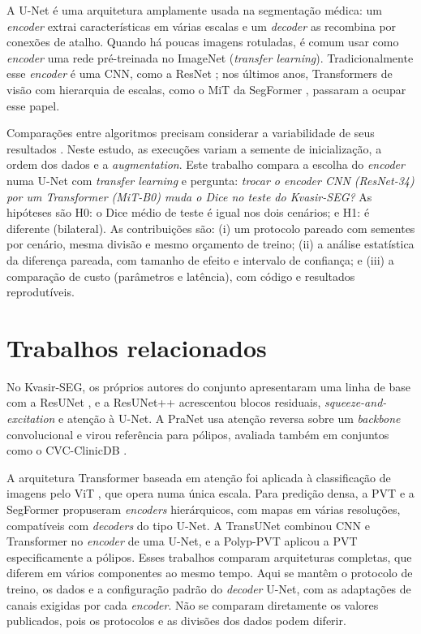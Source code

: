 \documentclass[conference]{IEEEtran}
\begin{document}
A U-Net \cite{ronneberger2015unet} é uma arquitetura amplamente usada na segmentação médica: um
\textit{encoder} extrai características em várias escalas e um \textit{decoder} as recombina por
conexões de atalho. Quando há poucas imagens rotuladas, é comum usar como \textit{encoder} uma
rede pré-treinada no ImageNet \cite{deng2009imagenet} (\textit{transfer learning}).
Tradicionalmente esse \textit{encoder} é uma CNN, como a ResNet \cite{he2016resnet}; nos últimos
anos, Transformers de visão \cite{dosovitskiy2021vit} com hierarquia de escalas, como o MiT da
SegFormer \cite{xie2021segformer}, passaram a ocupar esse papel.

Comparações entre algoritmos precisam considerar a variabilidade de seus resultados
\cite{dietterich1998tests}. Neste estudo, as execuções variam a semente de inicialização,
a ordem dos dados e a \textit{augmentation}. Este trabalho compara a escolha do \textit{encoder} numa U-Net com
\textit{transfer learning} e pergunta: \emph{trocar o \textit{encoder} CNN (ResNet-34) por um
Transformer (MiT-B0) muda o Dice no teste do Kvasir-SEG?} As hipóteses são H0: o Dice médio de
teste é igual nos dois cenários; e H1: é diferente (bilateral). As contribuições são: (i) um
protocolo pareado com \NPairs{} sementes por cenário, mesma divisão e mesmo orçamento de treino;
(ii) a análise estatística da diferença pareada, com tamanho de efeito e intervalo de confiança;
e (iii) a comparação de custo (parâmetros e latência), com código e resultados reprodutíveis.

\section{Trabalhos relacionados}

No Kvasir-SEG, os próprios autores do conjunto apresentaram uma linha de base com a ResUNet
\cite{jha2020kvasir}, e a ResUNet++ \cite{jha2019resunetpp} acrescentou blocos residuais,
\textit{squeeze-and-excitation} e atenção à U-Net. A PraNet \cite{fan2020pranet} usa atenção
reversa sobre um \textit{backbone} convolucional e virou referência para pólipos, avaliada também
em conjuntos como o CVC-ClinicDB \cite{bernal2015cvc}.

A arquitetura Transformer baseada em atenção \cite{vaswani2017attention} foi aplicada à
classificação de imagens pelo ViT \cite{dosovitskiy2021vit}, que
opera numa única escala. Para predição densa, a PVT \cite{wang2021pvt} e a SegFormer
\cite{xie2021segformer} propuseram \textit{encoders} hierárquicos, com mapas em várias
resoluções, compatíveis com \textit{decoders} do tipo U-Net. A TransUNet
\cite{chen2021transunet} combinou CNN e Transformer no \textit{encoder} de uma U-Net, e a
Polyp-PVT \cite{dong2023polyppvt} aplicou a PVT especificamente a pólipos. Esses trabalhos
comparam arquiteturas completas, que diferem em vários componentes ao mesmo tempo. Aqui se
mantêm o protocolo de treino, os dados e a configuração padrão do \textit{decoder} U-Net,
com as adaptações de canais exigidas por cada \textit{encoder}. Não se comparam diretamente
os valores publicados, pois os protocolos e as divisões dos dados podem diferir.
\end{document}

